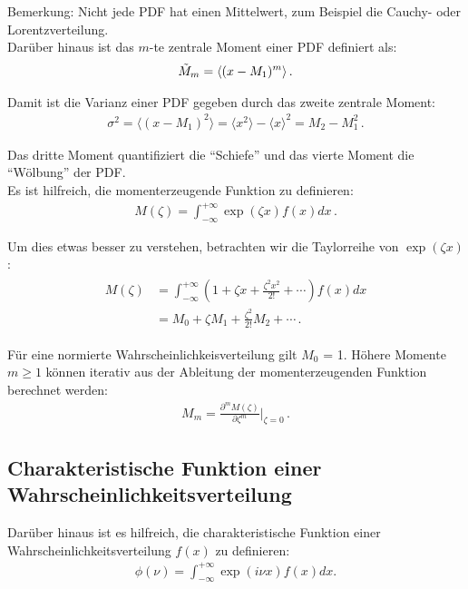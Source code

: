 Bemerkung: Nicht jede PDF hat einen Mittelwert, zum Beispiel die Cauchy- oder Lorentzverteilung.\\[0.3 cm]
Dar\"uber hinaus ist das $m$-te zentrale Moment einer PDF definiert als:
\begin{align}
\Tilde{M}_m = \langle ( x - M_1 )^m \rangle\,.
\label{eq:vl4-22}
\end{align}

Damit ist die Varianz einer PDF gegeben durch das zweite zentrale Moment:
\begin{align}
\sigma^2 = \langle ( x - M_1)^2 \rangle = \langle x^2 \rangle - \langle x \rangle^2 = M_2 - M_1^2\,.
\label{eq:vl4-23}
\end{align}

Das dritte Moment quantifiziert die ``Schiefe'' und das vierte Moment die ``W\"olbung'' der PDF.\\[0.3 cm]
Es ist hilfreich, die momenterzeugende Funktion zu definieren:
\begin{align}
M ( \zeta ) = \int_{-\infty}^{+\infty} \exp ( \zeta x ) f ( x ) dx\,.
\label{eq:vl4-24}
\end{align}

Um dies etwas besser zu verstehen, betrachten wir die Taylorreihe von $\exp ( \zeta x )$:
\begin{align}
\begin{split}
M ( \zeta ) & = \int_{-\infty}^{+\infty} \left( 1 + \zeta x + \frac{ \zeta^2 x^2 }{ 2! } + \cdots \right) f ( x ) dx\\
& = M_0 + \zeta M_1 + \frac{ \zeta^2 }{ 2! } M_2 + \cdots \,.
\end{split}
\label{eq:vl4-25}
\end{align}

F\"ur eine normierte Wahrscheinlichkeisverteilung gilt $M_0$ = 1. H\"ohere Momente $m \geq 1$ k\"onnen iterativ aus der Ableitung der momenterzeugenden Funktion berechnet werden:
\begin{align}
M_m = \frac{ \partial^m M ( \zeta ) }{ \partial \zeta^m} \bigg|_{\zeta = 0}\,.
\label{eq:vl4-26}
\end{align}


\subsection{Charakteristische Funktion einer Wahrscheinlichkeitsverteilung}
\label{subsec:vl4-7}

Dar\"uber hinaus ist es hilfreich, die charakteristische Funktion einer Wahrscheinlichkeitsverteilung $f ( x )$ zu definieren:
\begin{align}
\phi ( \nu ) = \int_{-\infty}^{+\infty} \exp ( i \nu x) f ( x ) dx.
\label{eq:vl4-27}
\end{align}

